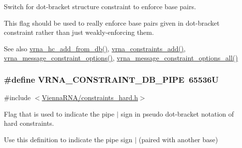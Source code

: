 Switch for dot-\/bracket structure constraint to enforce base pairs. 

This flag should be used to really enforce base pairs given in dot-\/bracket constraint rather than just weakly-\/enforcing them.

\begin{DoxySeeAlso}{See also}
\hyperlink{group__hard__constraints_ga5b4de3247b67358080c176b94591a8e6}{vrna\+\_\+hc\+\_\+add\+\_\+from\+\_\+db()}, \hyperlink{group__constraints_ga35a401f680969a556858a8dd5f1d07cc}{vrna\+\_\+constraints\+\_\+add()}, \hyperlink{group__constraints_gaa1f20b53bf09ac2e6b0dbb13f7d89670}{vrna\+\_\+message\+\_\+constraint\+\_\+options()}, \hyperlink{group__constraints_gaec7e13fa0465c2acc7a621d1aecb709f}{vrna\+\_\+message\+\_\+constraint\+\_\+options\+\_\+all()} 
\end{DoxySeeAlso}
\hypertarget{group__hard__constraints_ga13053547a2de5532b64b64d35e097ae1}{}
\subsubsection[{V\+R\+N\+A\+\_\+\+C\+O\+N\+S\+T\+R\+A\+I\+N\+T\+\_\+\+D\+B\+\_\+\+P\+I\+P\+E}]{\setlength{\rightskip}{0pt plus 5cm}\#define V\+R\+N\+A\+\_\+\+C\+O\+N\+S\+T\+R\+A\+I\+N\+T\+\_\+\+D\+B\+\_\+\+P\+I\+P\+E~65536\+U}\label{group__hard__constraints_ga13053547a2de5532b64b64d35e097ae1}


{\ttfamily \#include $<$\hyperlink{constraints__hard_8h}{Vienna\+R\+N\+A/constraints\+\_\+hard.\+h}$>$}



Flag that is used to indicate the pipe \textquotesingle{}$\vert$\textquotesingle{} sign in pseudo dot-\/bracket notation of hard constraints. 

Use this definition to indicate the pipe sign \textquotesingle{}$\vert$\textquotesingle{} (paired with another base)


